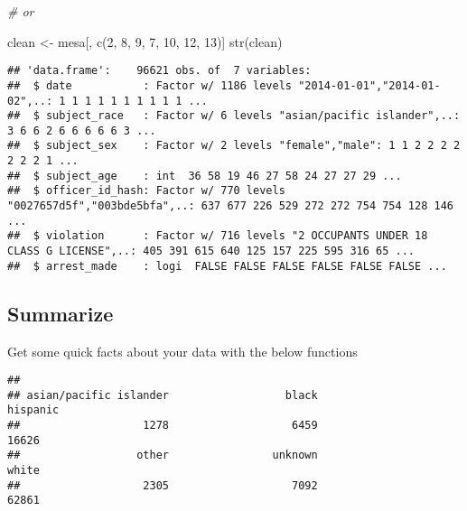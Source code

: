 \documentclass[
]{article}
\newenvironment{Shaded}{\begin{snugshade}}{\end{snugshade}}
\newcommand{\CommentTok}[1]{\textcolor[rgb]{0.56,0.35,0.01}{\textit{#1}}}
\newcommand{\DecValTok}[1]{\textcolor[rgb]{0.00,0.00,0.81}{#1}}
\newcommand{\FunctionTok}[1]{\textcolor[rgb]{0.00,0.00,0.00}{#1}}
\newcommand{\NormalTok}[1]{#1}
\newcommand{\OtherTok}[1]{\textcolor[rgb]{0.56,0.35,0.01}{#1}}
\newcommand{\SpecialCharTok}[1]{\textcolor[rgb]{0.00,0.00,0.00}{#1}}
\begin{document}
\begin{Shaded}
\begin{Highlighting}[]
\CommentTok{\# or}

\NormalTok{clean }\OtherTok{\textless{}{-}}\NormalTok{ mesa[, }\FunctionTok{c}\NormalTok{(}\DecValTok{2}\NormalTok{, }\DecValTok{8}\NormalTok{, }\DecValTok{9}\NormalTok{, }\DecValTok{7}\NormalTok{, }\DecValTok{10}\NormalTok{, }\DecValTok{12}\NormalTok{, }\DecValTok{13}\NormalTok{)]}
\FunctionTok{str}\NormalTok{(clean)}
\end{Highlighting}
\end{Shaded}

\begin{verbatim}
## 'data.frame':    96621 obs. of  7 variables:
##  $ date           : Factor w/ 1186 levels "2014-01-01","2014-01-02",..: 1 1 1 1 1 1 1 1 1 1 ...
##  $ subject_race   : Factor w/ 6 levels "asian/pacific islander",..: 3 6 6 2 6 6 6 6 6 3 ...
##  $ subject_sex    : Factor w/ 2 levels "female","male": 1 1 2 2 2 2 2 2 2 1 ...
##  $ subject_age    : int  36 58 19 46 27 58 24 27 27 29 ...
##  $ officer_id_hash: Factor w/ 770 levels "0027657d5f","003bde5bfa",..: 637 677 226 529 272 272 754 754 128 146 ...
##  $ violation      : Factor w/ 716 levels "2 OCCUPANTS UNDER 18 CLASS G LICENSE",..: 405 391 615 640 125 157 225 595 316 65 ...
##  $ arrest_made    : logi  FALSE FALSE FALSE FALSE FALSE FALSE ...
\end{verbatim}

\hypertarget{summarize}{%
\subsection{Summarize}\label{summarize}}

Get some quick facts about your data with the below functions

\begin{Shaded}
\end{Shaded}

\begin{verbatim}
## 
## asian/pacific islander                  black               hispanic 
##                   1278                   6459                  16626 
##                  other                unknown                  white 
##                   2305                   7092                  62861
\end{verbatim}
\end{document}
